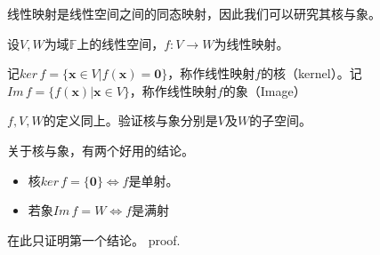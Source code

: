 
线性映射是线性空间之间的同态映射，因此我们可以研究其核与象。
\begin{definition}{}
设$V,W$为域$\mathbb F$上的线性空间，$f:V\rightarrow W$为线性映射。

记$ker\,f=\{\boldsymbol x\in V|f(\boldsymbol x)=\boldsymbol 0\}$，称作线性映射$f$的核（kernel）。记$Im\,f=\{f(\boldsymbol x)|\boldsymbol x\in V\}$，称作线性映射$f$的象（Image）
\end{definition}
\begin{exercise}{}
$f,V,W$的定义同上。验证核与象分别是$V$及$W$的子空间。
\end{exercise}
关于核与象，有两个好用的结论。
\begin{itemize}
\item 核$ker\,f=\{\boldsymbol 0\}\Longleftrightarrow f$是单射。
\item 若象$Im\,f=W\Longleftrightarrow f$是满射
\end{itemize}
在此只证明第一个结论。
proof.
